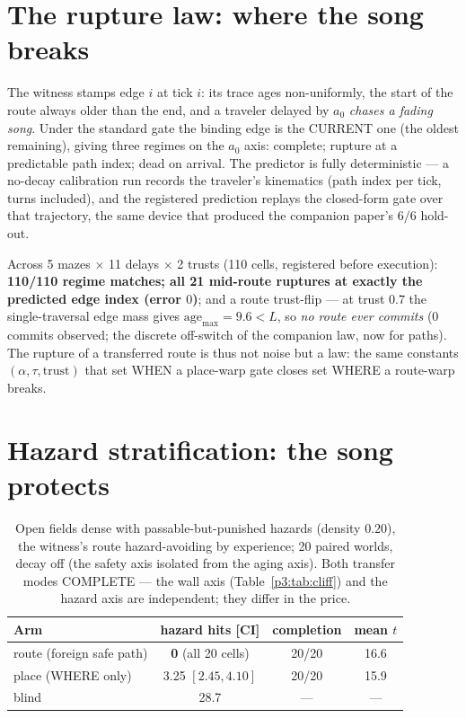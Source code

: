 \documentclass{article}
\begin{document}
\section{The rupture law: where the song breaks}
\label{p3:sec:rupture}

The witness stamps edge $i$ at tick $i$: its trace ages
non-uniformly, the start of the route always older than the end, and
a traveler delayed by $a_0$ \emph{chases a fading song}. Under the
standard gate the binding edge is the CURRENT one (the oldest
remaining), giving three regimes on the $a_0$ axis: complete;
rupture at a predictable path index; dead on arrival. The predictor
is fully deterministic --- a no-decay calibration run records the
traveler's kinematics (path index per tick, turns included), and the
registered prediction replays the closed-form gate over that
trajectory, the same device that produced the companion paper's
$6/6$ hold-out.

Across 5 mazes $\times$ 11 delays $\times$ 2 trusts (110 cells,
registered before execution): \textbf{110/110 regime matches; all 21
mid-route ruptures at exactly the predicted edge index (error $0$)};
and a route trust-flip --- at trust $0.7$ the single-traversal edge
mass gives $\mathrm{age}_{\max} = 9.6 < L$, so \emph{no route ever
commits} (0 commits observed; the discrete off-switch of the
companion law, now for paths). The rupture of a transferred route is
thus not noise but a law: the same constants
$(\alpha,\tau,\text{trust})$ that set WHEN a place-warp gate closes
set WHERE a route-warp breaks.

\section{Hazard stratification: the song protects}
\label{p3:sec:hazard}

\begin{table}[h]
\centering
\caption{Open fields dense with passable-but-punished hazards
(density $0.20$), the witness's route hazard-avoiding by experience;
20 paired worlds, decay off (the safety axis isolated from the aging
axis). Both transfer modes COMPLETE --- the wall axis
(Table~\ref{p3:tab:cliff}) and the hazard axis are independent; they
differ in the price.}
\label{p3:tab:hazard}
\small
\begin{tabular}{lccc}
\toprule
Arm & hazard hits [CI] & completion & mean $t$ \\
\midrule
route (foreign safe path) & \textbf{0} (all 20 cells) & 20/20 & 16.6 \\
place (WHERE only) & 3.25 $[2.45, 4.10]$ & 20/20 & 15.9 \\
blind & 28.7 & --- & --- \\
\bottomrule
\end{tabular}
\end{table}
\end{document}
